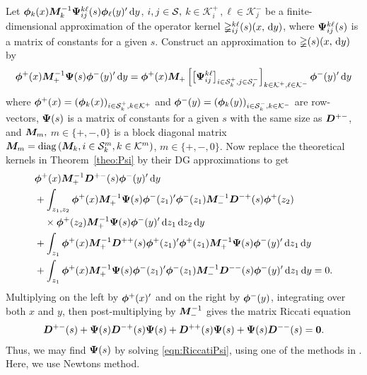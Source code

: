Let \(\boldsymbol\phi_k(x){\boldsymbol M}_k^{-1}\boldsymbol \Psi_{ij}^{k\ell}(s)\boldsymbol\phi_\ell(y)'{}\, \mathrm{d} y\), \(i,j\in\mathcal{S},\) \(k\in\mathcal K_i^+\,, \ell\in\mathcal K_j^-\) be a finite-dimensional approximation of the operator kernel \(\mathbb\Psi_{ij}^{k\ell}(s)(x,\, \mathrm{d} y)\), where \(\boldsymbol \Psi_{ij}^{k\ell}(s)\) is a matrix of constants for a given \(s\). Construct an approximation to \(\mathbb\Psi(s)(x,\, \mathrm{d} y)\) by 
\[\boldsymbol\phi^+(x){\boldsymbol M}_+^{-1}\boldsymbol \Psi(s)\boldsymbol\phi^-(y)'{}\, \mathrm{d} y = \boldsymbol \phi^+(x)\boldsymbol M_+ \left[\left[\boldsymbol \Psi_{ij}^{k\ell}\right]_{i\in\mathcal{S}_k^+,j\in\mathcal{S}_\ell^-}\right]_{k\in\mathcal K^+,\ell\in\mathcal K^-}\boldsymbol \phi^-(y)'\, \mathrm{d} y\]%
where \(\boldsymbol\phi^+(x) = (\boldsymbol\phi_k(x))_{i\in\mathcal{S}_k^+,k\in\mathcal K^+}\) and \(\boldsymbol\phi^-(y) = (\boldsymbol\phi_k(y))_{i\in\mathcal{S}_k^-,k\in\mathcal K^-}\) are row-vectors, \(\boldsymbol \Psi(s)\) is a matrix of constants for a given \(s\) with the same size as \(\boldsymbol D^{+-}\), and \({\boldsymbol M}_m,\) \(m\in\{+,-,0\}\) is a block diagonal matrix \({\boldsymbol M}_m = \mathrm{diag}\left(  \boldsymbol M_k, {i\in\mathcal{S}_k^m}, {k\in\mathcal K^m}\right)\), \(m\in\{+,-,0\}\). Now replace the theoretical kernels in Theorem~\ref{theo:Psi} by their DG approximations to get 
\begin{align*}
&\boldsymbol\phi^+(x){\boldsymbol M}_+^{-1}  \boldsymbol D^{+-}(s)\boldsymbol\phi^-(y)'{}\, \mathrm{d} y
\\&{}+ \int_{z_1,z_2}\boldsymbol\phi^+(x){\boldsymbol M}_+^{-1}\boldsymbol \Psi(s)\boldsymbol\phi^-(z_1)'{}\boldsymbol\phi^-(z_1) {\boldsymbol M}_-^{-1}  \boldsymbol D^{-+}(s)\boldsymbol\phi^+(z_2)
\\&{}\quad\times\boldsymbol\phi^+(z_2){\boldsymbol M}_+^{-1}\boldsymbol \Psi(s)\boldsymbol\phi^-(y)'{}\, \mathrm{d} z_1\, \mathrm{d} z_2\, \mathrm{d} y
\\&{}+ \int_{z_1}\boldsymbol\phi^+(x){\boldsymbol M}_+^{-1}  \boldsymbol D^{++}(s)\boldsymbol\phi^+(z_1)'{}\boldsymbol\phi^+(z_1) {\boldsymbol M}_+^{-1}\boldsymbol \Psi(s)\boldsymbol\phi^-(y)'{}\, \mathrm{d} z_1\, \mathrm{d} y
\\&{}+ \int_{z_1}\boldsymbol\phi^+(x){\boldsymbol M}_+^{-1}\boldsymbol \Psi(s)\boldsymbol\phi^-(z_1)'{}\boldsymbol\phi^-(z_1){\boldsymbol M}_-^{-1}  \boldsymbol D^{--}(s)\boldsymbol\phi^-(y)'{}\, \mathrm{d} z_1\, \mathrm{d} y
= 0.
\end{align*}
Multiplying on the left by \(\boldsymbol\phi^+(x)'{}\) and on the right by \(\boldsymbol\phi^-(y)\), integrating over both \(x\) and \(y\), then post-multiplying by \({\boldsymbol M}^{-1}_-\) gives the matrix Riccati equation
\begin{align}\label{eqn:RiccatiPsi}
    \boldsymbol D^{+-}(s)
+ \boldsymbol \Psi(s)   \boldsymbol D^{-+}(s)\boldsymbol \Psi(s)
+   \boldsymbol D^{++}(s)\boldsymbol \Psi(s)
+ \boldsymbol \Psi(s)  \boldsymbol D^{--}(s)
= \boldsymbol 0.
\end{align}
Thus, we may find \(\boldsymbol \Psi(s)\) by solving \eqref{eqn:RiccatiPsi}, using one of the methods in \citep{bot08}. Here, we use Newtons method. 

